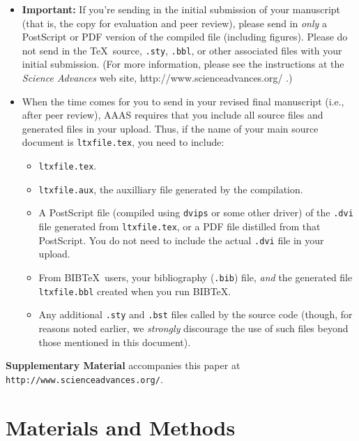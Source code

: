 \documentclass[12pt]{article}
\begin{document}
\begin{itemize}
\item {\bf Important:} If you're sending in the initial submission of
  your manuscript (that is, the copy for evaluation and peer review),
  please send in {\it only\/} a PostScript or PDF version of the
  compiled file (including figures).  Please do not send in the \TeX\ 
  source, \texttt{.sty}, \texttt{.bbl}, or other associated files with
  your initial submission.  (For more information, please see the
  instructions at the {\it Science Advances\/} web site,
  http://www.scienceadvances.org/ .)
\item When the time comes for you to send in your revised final
  manuscript (i.e., after peer review), AAAS requires that you include
  all source files and generated files in your upload.  Thus, if the
  name of your main source document is \texttt{ltxfile.tex}, you
  need to include:
\begin{itemize}
\item \texttt{ltxfile.tex}.
\item \texttt{ltxfile.aux}, the auxilliary file generated by the
  compilation.
\item A PostScript file (compiled using \texttt{dvips} or some other
  driver) of the \texttt{.dvi} file generated from
  \texttt{ltxfile.tex}, or a PDF file distilled from that
  PostScript.  You do not need to include the actual \texttt{.dvi}
  file in your upload.
\item From B{\small{IB}}\TeX\ users, your bibliography (\texttt{.bib})
  file, {\it and\/} the generated file \texttt{ltxfile.bbl} created
  when you run B{\small{IB}}\TeX.
\item Any additional \texttt{.sty} and \texttt{.bst} files called by
  the source code (though, for reasons noted earlier, we {\it
    strongly\/} discourage the use of such files beyond those
  mentioned in this document).
\end{itemize}
\end{itemize}


\noindent \textbf{Supplementary Material} accompanies this paper at {\small {\tt http://www.scienceadvances.org/}}.



\section*{Materials and Methods}
% 
\end{document}
